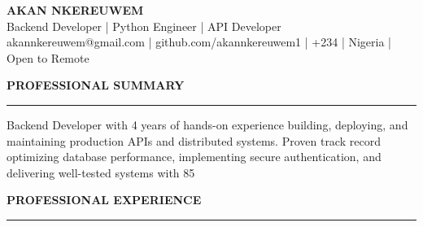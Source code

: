 \documentclass[11pt,letterpaper]{article}
\newcommand{\sectionheading}[1]{
  \vspace{6pt}
  {\large\textbf{#1}}
  \vspace{3pt}
  \hrule
  \vspace{6pt}
}
\begin{document}
\begin{center}
  {\LARGE\textbf{AKAN NKEREUWEM}}\\
  \vspace{3pt}
  Backend Developer | Python Engineer | API Developer\\
  \vspace{5pt}
  akannkereuwem@gmail.com | github.com/akannkereuwem1 | +234 | Nigeria | Open to Remote
\end{center}

\vspace{3pt}

\sectionheading{PROFESSIONAL SUMMARY}
Backend Developer with 4 years of hands-on experience building, deploying, and maintaining production APIs and distributed systems. Proven track record optimizing database performance, implementing secure authentication, and delivering well-tested systems with 85%

\sectionheading{PROFESSIONAL EXPERIENCE}
\end{document}
